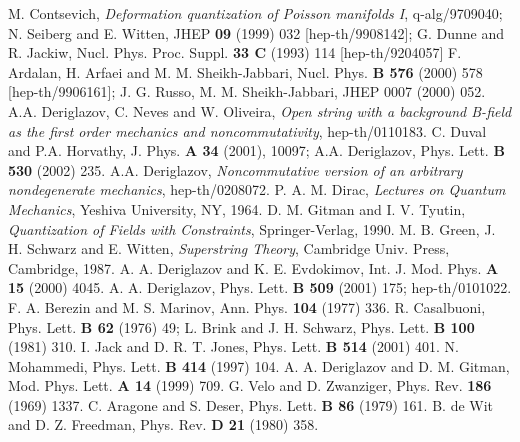 \documentclass[paper a4]{article}
\begin{document}
\begin{thebibliography}{nn}
\bibitem{} M. Contsevich, {\em Deformation quantization of Poisson
manifolds I}, q-alg/9709040;
\bibitem{} N. Seiberg and E. Witten,
JHEP {\bf 09} (1999) 032 [hep-th/9908142];
\bibitem{} G. Dunne and R. Jackiw, Nucl. Phys. Proc. Suppl.
{\bf 33 C} (1993) 114 [hep-th/9204057]
\bibitem{} F. Ardalan, H. Arfaei and M. M. Sheikh-Jabbari,
Nucl. Phys. {\bf B 576} (2000) 578 [hep-th/9906161];
J. G. Russo, M. M. Sheikh-Jabbari, JHEP 0007 (2000) 052.
\bibitem{} A.A. Deriglazov, C. Neves and W. Oliveira, {\em Open string
with a background B-field as the first order mechanics and
noncommutativity}, hep-th/0110183.
\bibitem{} C. Duval and P.A. Horvathy, J. Phys. {\bf A 34} (2001),
10097;
\bibitem{} A.A. Deriglazov, Phys. Lett. {\bf B 530} (2002) 235.
\bibitem{} A.A. Deriglazov, {\em Noncommutative version of an arbitrary
nondegenerate mechanics}, hep-th/0208072.
\bibitem{} P. A. M. Dirac, {\em Lectures on Quantum Mechanics},
Yeshiva University, NY, 1964.
\bibitem{} D. M. Gitman and I. V. Tyutin, {\em Quantization of Fields
with Constraints}, Springer-Verlag, 1990.
\bibitem{} M. B. Green, J. H. Schwarz and E. Witten, {\em Superstring
Theory}, Cambridge Univ. Press, Cambridge, 1987.
\bibitem{} A. A. Deriglazov and K. E. Evdokimov, Int. J. Mod. Phys.
{\bf A 15} (2000) 4045.
\bibitem{} A. A. Deriglazov, Phys. Lett. {\bf B 509} (2001) 175;
hep-th/0101022.
\bibitem{} F. A. Berezin and M. S. Marinov, Ann. Phys. {\bf 104}
(1977) 336.
\bibitem{} R. Casalbuoni, Phys. Lett. {\bf B 62} (1976) 49;
L. Brink and J. H. Schwarz, Phys. Lett. {\bf B 100} (1981) 310.
\bibitem{} I. Jack and D. R. T. Jones, Phys. Lett. {\bf B 514} (2001) 401.
\bibitem{} N. Mohammedi, Phys. Lett. {\bf B 414} (1997) 104.
\bibitem{} A. A. Deriglazov and D. M. Gitman, Mod. Phys. Lett.
{\bf A 14} (1999) 709.
\bibitem{} G. Velo and D. Zwanziger, Phys. Rev. {\bf 186} (1969) 1337.
\bibitem{} C. Aragone and S. Deser, Phys. Lett. {\bf B 86} (1979) 161.
\bibitem{} B. de Wit and D. Z. Freedman, Phys. Rev. {\bf D 21} (1980) 358.
\end{thebibliography}
\end{document}
